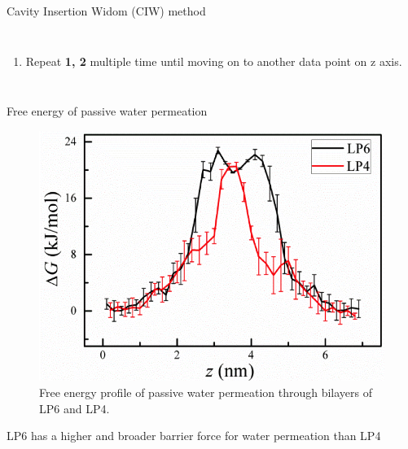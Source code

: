 \documentclass{beamer}
\begin{document}
\begin{frame}[label=CIW]{Cavity Insertion Widom (CIW) method}
\begin{columns}
\begin{enumerate}
		\begin{equation}
			\Delta G(z) = \mu_{ex}(z) - \mu_{ex}(z_0)
		\end{equation}
		where 
		\begin{equation}
			\tiny \mu_{ex}(z) = -RT ln\left\langle \frac{PV}{(N+3)RT} exp(\frac{-\Delta U(z)}{kT}) \right\rangle - RT ln\langle \rho_{cavity}(z) \rangle
		\end{equation}
		and $\mu_{ex}(z_0)$ is the reference potential in the water bulk. 
		\item Repeat \textbf{1, 2} multiple time until moving on to another data point on z axis.  
	\end{enumerate}		
\end{columns}
\end{frame}

\begin{frame}[label=CIWR]{Free energy of passive water permeation}
	\begin{figure}
		\includegraphics[width=.65\linewidth]{Pics/Lipid_fe.png}
		\caption{Free energy profile of passive water permeation through bilayers of LP6 and LP4. }
	\end{figure}
\vspace{-.3cm}
	LP6 has a higher and broader barrier force for water permeation than LP4

\end{frame}

\end{document}
